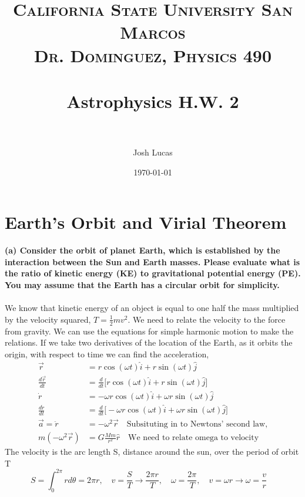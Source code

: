 \documentclass[paper=a4, fontsize=11pt]{scrartcl} %
\title{	
\normalfont \normalsize 
\textsc{California State University San Marcos \\ Dr. Dominguez, Physics 490} \\ [25pt] %
\horrule{0.5pt} \\[0.4cm] %
\huge Astrophysics H.W. 2 \\ %
\horrule{2pt} \\[0.5cm] %
}
\author{Josh Lucas} %
\date{\normalsize\today} %
\numberwithin{equation}{section} %
\numberwithin{figure}{section} %
\numberwithin{table}{section} %
\begin{document}
\maketitle %


\section{Earth's Orbit and Virial Theorem}

\textbf{(a) Consider the orbit of planet Earth, which is established by the interaction between the Sun and Earth masses. Please evaluate what is the ratio of kinetic energy (KE) to gravitational potential energy (PE). You may assume that the Earth has a circular orbit for simplicity.}\\
\\
We know that kinetic energy of an object is equal to one half the mass multiplied by the velocity squared, $T =\frac{1}{2}mv^2$. We need to relate the velocity to the force from gravity. We can use the equations for simple harmonic motion to make the relations. If we take two derivatives of the location of the Earth, as it orbits the origin, with respect to time we can find the acceleration,
\begin{align*}
\vec{r} & = r \cos(\omega t) \hat{i} + r \sin(\omega t) \hat{j} \\
\frac{d \vec{r}}{dt} & = \frac{d}{dt} \big[ r\cos(\omega t) \hat{i} + r\sin(\omega t) \hat{j} \big]\\
\dot{r} & = -\omega r\cos(\omega t)\hat{i} + \omega r \sin(\omega t)\hat{j} \\
\frac{d \dot{r}}{dt} & = \frac{d}{dt} \big[ - \omega r\cos(\omega t) \hat{i} + \omega r\sin(\omega t) \hat{j} \big]\\
\vec{a} = \ddot{r} & = - \omega^2 \vec{r}\quad \text{Subsituting in to Newtons' second law,}\\ 
m(-\omega^2 \vec{r}) & = G\frac{Mm}{r^2} \hat{r} \quad \text{We need to relate omega to velocity}
\end{align*}
The velocity is the arc length S, distance around the sun, over the period of orbit T
\begin{equation*}
S  = \int_0^{2\pi} r d\theta = 2\pi r,\quad  v = \frac{S}{T} \rightarrow \frac{2\pi r}{T}, \quad \omega  = \frac{2\pi}{T}, \quad v = \omega r \rightarrow \omega = \frac{v}{r}\quad 
\end{equation*}
\end{document}
